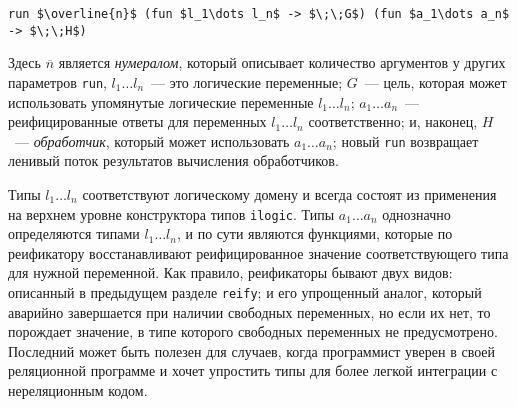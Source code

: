 \begin{lstlisting}[mathescape=true]
   run $\overline{n}$ (fun $l_1\dots l_n$ -> $\;\;G$) (fun $a_1\dots a_n$ -> $\;\;H$)
\end{lstlisting}

\noindent Здесь $\overline{n}$ является \emph{нумералом}, который описывает количество аргументов у других параметров \lstinline|run|,
\mbox{$l_1\dots l_n$}~--- это логические переменные;
$G$~--- цель, которая может использовать упомянутые логические переменные \mbox{$l_1\dots l_n$};
\mbox{$a_1\dots a_n$}~---  реифицированные ответы для переменных \mbox{$l_1\dots l_n$} соответственно; и,
наконец, $H$~--- \emph{обработчик}, который может использовать \mbox{$a_1\dots a_n$};
новый \lstinline|run| возвращает ленивый поток результатов вычисления обработчиков.



Типы \mbox{$l_1\dots l_n$} соответствуют логическому домену и всегда состоят из применения на верхнем уровне конструктора типов \lstinline|ilogic|.
%
%
Типы \mbox{$a_1\dots a_n$} однозначно определяются типами \mbox{$l_1\dots l_n$}, и по сути являются функциями, которые по реификатору восстанавливают реифицированное значение соответствующего типа для нужной переменной.
Как правило, реификаторы бывают двух видов: описанный в предыдущем разделе \lstinline|reify|; и его упрощенный аналог, который аварийно завершается при наличии свободных переменных, но если их нет, то порождает значение, в типе которого свободных переменных не предусмотрено.
Последний может быть полезен для случаев, когда программист уверен в своей реляционной программе и хочет упростить типы для более легкой интеграции с нереляционным кодом.

